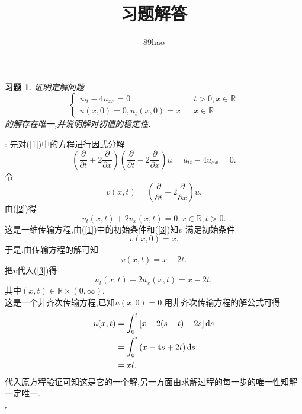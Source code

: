 \documentclass[a4paper]{article}
\newcommand\R{\ensuremath{\mathbb{R}}}
\newtheorem*{exe}{习题}
\newenvironment{pro}{{\noindent\bfseries 证明}:}{\hfill $\square$\par}
\begin{document}
\title{习题解答}
\author{89hao}
\maketitle
\begin{exe}
  证明定解问题
  \begin{equation}
 \left\{\begin{array}{lcr}
   u_{tt}-4u_{xx}=0 & & t>0,x\in \R\\
   u(x,0)=0, u_{t}(x,0)=x& & x\in \R
 \end{array}\right.\label{1} 
 \end{equation}
 的解存在唯一,并说明解对初值的稳定性.
\end{exe}
\begin{pro}
  先对(\ref{1})中的方程进行因式分解
  \begin{equation}
    \left( \frac{\partial}{\partial t}+2\frac{\partial}{\partial x} \right) \left( \frac{\partial}{\partial t}-2\frac{\partial}{\partial x} \right)u=u_{tt}-4u_{xx}=0.\label{2} 
  \end{equation}
  令
  \begin{equation}
    v(x,t)=\left( \frac{\partial}{\partial t}-2\frac{\partial}{\partial x} \right) u.\label{3}
  \end{equation}
  由(\ref{2})得
  \begin{equation*}
    v_t(x,t)+2v_x(x,t)=0, x\in \R,t>0.
  \end{equation*}
  这是一维传输方程,由(\ref{1})中的初始条件和(\ref{3})知$v$ 满足初始条件
  \[
    v(x,0)=x
  .\] 
  于是,由传输方程的解可知
  \[
    v(x,t)=x-2t
  .\]
  把$v$代入(\ref{3})得
   \begin{equation*}
     u_t(x,t)-2u_x(x,t)=x-2t,
  \end{equation*}
  其中$(x,t)\in \R\times (0,\infty)$.\\
  这是一个非齐次传输方程,已知$u(x,0)=0$,用非齐次传输方程的解公式可得
  \begin{align}
    u(x,t)&=\int_0^t \left[ x-2(s-t)-2s\right]\mathrm{d}s\notag\\
    &=\int_0^{t}\left( x-4s+2t \right) \mathrm{d}s\notag\\
    &=xt
  .\end{align}
代入原方程验证可知这是它的一个解,另一方面由求解过程的每一步的唯一性知解一定唯一.


\end{pro}
\end{document}
